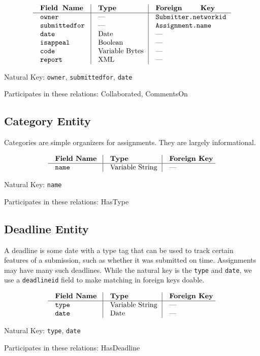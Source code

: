 $$\vbox{
  \offinterlineskip
  \halign{
    \strut \quad {\tt #}  & \vrule\quad #  & \vrule\quad # \cr
    {\bf Field Name}  & {\bf Type}  & {\bf Foreign Key}\cr
    \noalign{\hrule}    
    owner  & ---  & {\tt Submitter.networkid} \cr
    submittedfor  & ---  & {\tt Assignment.name} \cr
    date  & Date  & --- \cr
    isappeal  & Boolean  & --- \cr
    code  & Variable Bytes  & --- \cr
    report  & XML  & --- \cr
  }
}$$

{\noindent
Natural Key: {\tt owner}, {\tt submittedfor}, {\tt date}\par\noindent
Participates in these relations: Collaborated, CommentsOn \par}

\subsection{Category Entity}
Categories are simple organizers for assignments. 
They are largely informational.

$$\vbox{
  \offinterlineskip
  \halign{
    \strut \quad {\tt #}  & \vrule\quad #  & \vrule\quad # \cr
    {\bf Field Name}  & {\bf Type}  & {\bf Foreign Key}\cr
    \noalign{\hrule}    
    name  & Variable String  & --- \cr
  }
}$$

{\noindent
Natural Key: {\tt name}\par\noindent
Participates in these relations: HasType \par}

\subsection{Deadline Entity}
A deadline is some date with a type tag that can be used to track certain
features of a submission, such as whether it was submitted on time.
Assignments may have many such deadlines. While the natural key is 
the {\tt type} and {\tt date}, we use a {\tt deadlineid} field to make 
matching in foreign keys doable.

$$\vbox{
  \offinterlineskip
  \halign{
    \strut \quad {\tt #}  & \vrule\quad #  & \vrule\quad # \cr
    {\bf Field Name}  & {\bf Type}  & {\bf Foreign Key}\cr
    \noalign{\hrule}
    type  & Variable String  & --- \cr
    date  & Date  & --- \cr
  }
}$$

{\noindent
Natural Key: {\tt type}, {\tt date}\par\noindent
Participates in these relations: HasDeadline \par}

